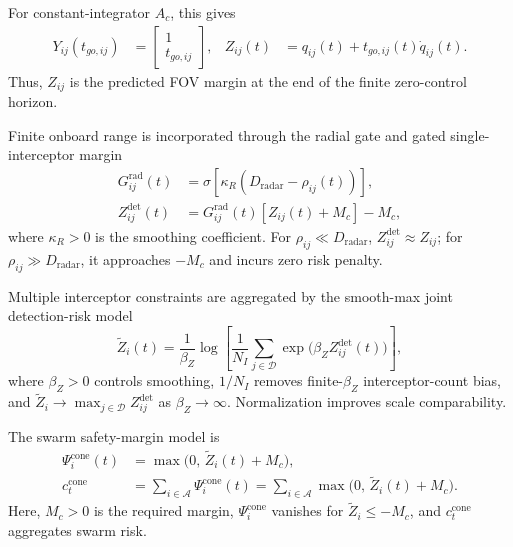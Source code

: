 \documentclass[unbranded]{cja}
\begin{document}
For constant-integrator $A_c$, this gives
\begin{equation}
\begin{aligned}
Y_{ij}(t_{go,ij})
&=
\begin{bmatrix}
1\\
t_{go,ij}
\end{bmatrix},&
Z_{ij}(t)
&=q_{ij}(t)+t_{go,ij}(t)\dot q_{ij}(t).
\end{aligned}
\end{equation}
Thus, $Z_{ij}$ is the predicted FOV margin at the end of the finite zero-control horizon.

Finite onboard range is incorporated through the radial gate and gated single-interceptor margin
\begin{equation}
\begin{aligned}
G_{ij}^{\mathrm{rad}}(t)
&=\sigma\!\left[\kappa_R\left(D_{\mathrm{radar}}-\rho_{ij}(t)\right)\right],\\
Z_{ij}^{\mathrm{det}}(t)
&=G_{ij}^{\mathrm{rad}}(t)\left[Z_{ij}(t)+M_c\right]-M_c,
\end{aligned}
\end{equation}
where $\kappa_R>0$ is the smoothing coefficient. For $\rho_{ij}\ll D_{\mathrm{radar}}$, $Z_{ij}^{\mathrm{det}}\approx Z_{ij}$; for $\rho_{ij}\gg D_{\mathrm{radar}}$, it approaches $-M_c$ and incurs zero risk penalty.

Multiple interceptor constraints are aggregated by the smooth-max joint detection-risk model
\begin{equation}
\widetilde Z_i(t)
=
\frac{1}{\beta_Z}
\log\left[
\frac{1}{N_I}
\sum_{j\in\mathcal{D}}
\exp\!\bigl(\beta_Z Z_{ij}^{\mathrm{det}}(t)\bigr)
\right],
\end{equation}
where $\beta_Z>0$ controls smoothing, $1/N_I$ removes finite-$\beta_Z$ interceptor-count bias, and $\widetilde Z_i\to\max_{j\in\mathcal D}Z_{ij}^{\mathrm{det}}$ as $\beta_Z\to\infty$. Normalization improves scale comparability.

The swarm safety-margin model is
\begin{equation}
\begin{aligned}
\Psi_i^{\mathrm{cone}}(t)
&=\max\bigl(0,\, \widetilde Z_i(t)+M_c\bigr),\\
c_t^{\mathrm{cone}}
&=\sum_{i\in\mathcal{A}}\Psi_i^{\mathrm{cone}}(t)
=\sum_{i\in\mathcal{A}}\max\bigl(0,\, \widetilde Z_i(t)+M_c\bigr).
\end{aligned}
\end{equation}
Here, $M_c>0$ is the required margin, $\Psi_i^{\mathrm{cone}}$ vanishes for $\widetilde Z_i\le-M_c$, and $c_t^{\mathrm{cone}}$ aggregates swarm risk.
\end{document}

